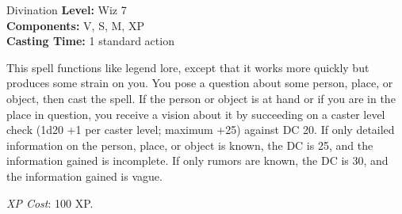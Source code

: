 {Divination}
{
	\textbf{Level:}
	Wiz 7\\
	\textbf{Components:}
	V, S, M, XP\\
	\textbf{Casting Time:}
	1 standard action\\
}
{
	This spell functions like legend lore, except that it works more quickly but produces some strain on you. You pose a question about some person, place, or object, then cast the spell. If the person or object is at hand or if you are in the place in question, you receive a vision about it by succeeding on a caster level check (1d20 +1 per caster level; maximum +25) against DC 20. If only detailed information on the person, place, or object is known, the DC is 25, and the information gained is incomplete. If only rumors are known, the DC is 30, and the information gained is vague.

	\textit{XP Cost}:
	100 XP.

}
